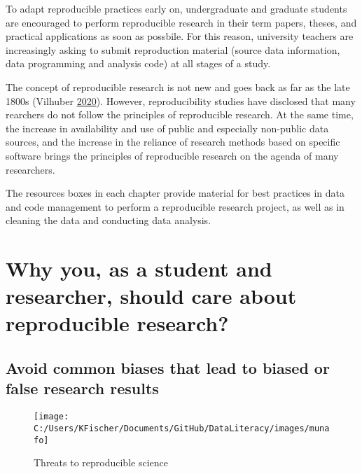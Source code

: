 \documentclass[
]{book}
\begin{document}
To adapt reproducible practices early on, undergraduate and graduate
students are encouraged to perform reproducible research in their term
papers, theses, and practical applications as soon as possbile. For this
reason, university teachers are increasingly asking to submit
reproduction material (source data information, data programming and
analysis code) at all stages of a study.

The concept of reproducible research is not new and goes back as far as
the late 1800s (Vilhuber
\protect\hyperlink{ref-vilhuber_reproducibility_2020}{2020}). However,
reproducibility studies have disclosed that many rearchers do not follow
the principles of reproducible research. At the same time, the increase
in availability and use of public and especially non-public data
sources, and the increase in the reliance of research methods based on
specific software brings the principles of reproducible research on the
agenda of many researchers.

The resources boxes in each chapter provide material for best practices
in data and code management to perform a reproducible research project,
as well as in cleaning the data and conducting data analysis.

\hypertarget{why-you-as-a-student-and-researcher-should-care-about-reproducible-research}{%
\section{Why you, as a student and researcher, should care about
reproducible
research?}\label{why-you-as-a-student-and-researcher-should-care-about-reproducible-research}}

\hypertarget{avoid-common-biases-that-lead-to-biased-or-false-research-results}{%
\subsection{Avoid common biases that lead to biased or false research
results}\label{avoid-common-biases-that-lead-to-biased-or-false-research-results}}

\begin{figure}

{\centering \texttt{[image: C:/Users/KFischer/Documents/GitHub/DataLiteracy/images/munafo]} 

}

\caption{Threats to reproducible science}\label{fig:munafo}
\end{figure}
\end{document}
